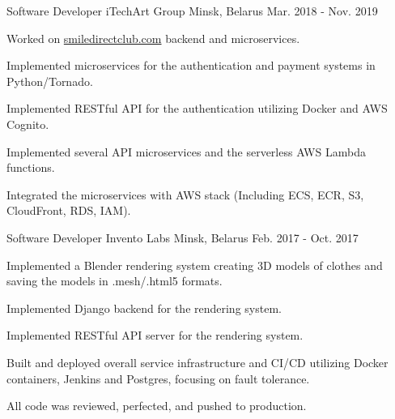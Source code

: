 

\begin{cventries}

  \cventry
    {Software Developer} %
    {iTechArt Group} %
    {Minsk, Belarus} %
    {Mar. 2018 - Nov. 2019} %
    {
      \begin{cvitems} %
        \item {Worked on \href{www.smiledirectclub.com}{smiledirectclub.com} backend and microservices.}
        \item {Implemented microservices for the authentication and payment systems in Python/Tornado.}
        \item {Implemented RESTful API for the authentication utilizing Docker and AWS Cognito.}
        \item {Implemented several API microservices and the serverless AWS Lambda functions.}
        \item {Integrated the microservices with AWS stack (Including ECS, ECR, S3, CloudFront, RDS, IAM).}
      \end{cvitems}
    }

  \cventry
    {Software Developer} %
    {Invento Labs} %
    {Minsk, Belarus} %
    {Feb. 2017 - Oct. 2017} %
    {
      \begin{cvitems} %
        \item {Implemented a Blender rendering system creating 3D models of clothes and saving the models in .mesh/.html5 formats.}
        \item {Implemented Django backend for the rendering system.}
        \item {Implemented RESTful API server for the rendering system.}
        \item {Built and deployed overall service infrastructure and CI/CD utilizing Docker containers, Jenkins and Postgres, focusing on fault tolerance.}
        \item {All code was reviewed, perfected, and pushed to production.}
      \end{cvitems}
    }

\end{cventries}
